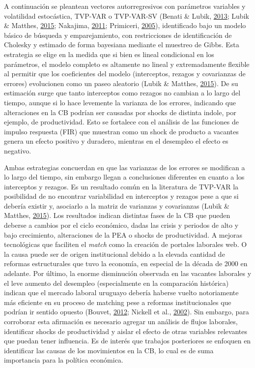 \documentclass[12pt,oneside]{reedthesis}
\begin{document}
A continuación se pleantean vectores autorregresivos con parámetros variables y volatilidad estocástica, TVP-VAR o TVP-VAR-SV (Benati \& Lubik, \protect\hyperlink{ref-Benati2013}{2013}; Lubik \& Matthes, \protect\hyperlink{ref-Lubik2016b}{2015}; Nakajima, \protect\hyperlink{ref-Nakajima2011}{2011}; Primiceri, \protect\hyperlink{ref-Primiceri2005}{2005}), identificado bajo un modelo básico de búsqueda y emparejamiento, con restricciones de identificación de Cholesky y estimado de forma bayesiana mediante el muestreo de Gibbs. Esta estrategia se elige en la medida que si bien es lineal condicional en los parámetros, el modelo completo es altamente no lineal y extremadamente flexible al permitir que los coeficientes del modelo (interceptos, rezagos y covarianzas de errores) evolucionen como un paseo aleatorio (Lubik \& Matthes, \protect\hyperlink{ref-Lubik2016b}{2015}). De su estimación surge que tanto interceptos como rezagos no cambian a lo largo del tiempo, aunque si lo hace levemente la varianza de los errores, indicando que alteraciones en la CB podrían ser causadas por shocks de distinta indole, por ejemplo, de productividad. Esto se fortalece con el análisis de las funciones de impulso respuesta (FIR) que muestran como un shock de producto a vacantes genera un efecto positivo y duradero, mientras en el desempleo el efecto es negativo.

Ambas estrategias concuerdan en que las varianzas de los errores se modifican a lo largo del tiempo, sin embargo llegan a conclusiones diferentes en cuanto a los interceptos y rezagos. Es un resultado común en la literatura de TVP-VAR la posibilidad de no encontrar variabilidad en interceptos y rezagos pese a que si debería existir y, asociarlo a la matriz de varianzas y covarianzas (Lubik \& Matthes, \protect\hyperlink{ref-Lubik2016b}{2015}). Los resultados indican distintas fases de la CB que pueden deberse a cambios por el ciclo económico, dadas las crisis y periodos de alto y bajo crecimiento, alteraciones de la PEA o shocks de productividad. A mejoras tecnológicas que faciliten el \emph{match} como la creación de portales laborales web. O la causa puede ser de origen institucional debido a la elevada cantidad de reformas estructurales que tuvo la economía, en especial de la década de 2000 en adelante. Por último, la enorme disminución observada en las vacantes laborales y el leve aumento del desempleo (especialmente en la comparación histórica) indican que el mercado laboral uruguayo debería haberse vuelto notoriamente más eficiente en su proceso de matching pese a reformas institucionales que podrían ir sentido opuesto (Bouvet, \protect\hyperlink{ref-Bouvet2012}{2012}; Nickell et al., \protect\hyperlink{ref-Nickell2002}{2002}). Sin embargo, para corroborar esta afirmación es necesario agregar un análisis de flujos laborales, identificar shocks de productividad y aislar el efecto de otras variables relevantes que puedan tener influencia. Es de interés que trabajos posteriores se enfoquen en identificar las causas de los movimientos en la CB, lo cual es de suma importancia para la política económica.
\end{document}

